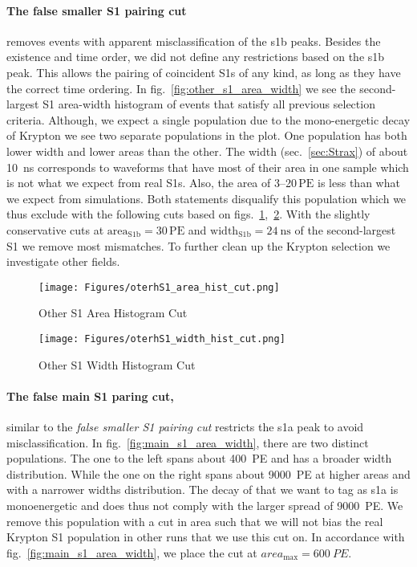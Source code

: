 \paragraph{The false smaller S1 pairing cut} removes events with apparent misclassification of the \gls{s1b} peaks.
Besides the existence and time order, we did not define any restrictions based on the \gls{s1b} peak.
This allows the pairing of coincident S1s of any kind, as long as they have the correct time ordering.
In fig.~\ref{fig:other_s1_area_width} we see the second-largest S1 area-width histogram of events that satisfy all previous selection criteria.
Although, we expect a single population due to the mono-energetic decay of Krypton we see two separate populations in the plot.
One population has both lower width and lower areas than the other.
The width (sec.~\ref{sec:Strax}) of about \SI{10}{\nano\s} corresponds to waveforms that have most of their area in one sample which is not what we expect from real S1s.
Also, the area of \numrange{3}{20}$\,\mathrm{PE}$ is less than what we expect from simulations.
Both statements disqualify this population which we thus exclude with the following cuts based on figs.~\ref{fig:other_s1_area_cut},~\ref{fig:other_s1_width_cut}.
With the slightly conservative cuts at $ \mathrm{area}_\mathrm{S1b} = 30\,\mathrm{PE}$ and $ \mathrm{width}_\mathrm{S1b} = \SI{24}{\nano\s} $ of the second-largest S1 we remove most mismatches.
To further clean up the Krypton selection we investigate other fields.


\begin{figure}[h]
\centering
\texttt{[image: Figures/oterhS1\_area\_hist\_cut.png]}  %
\caption[Other S1 Area Histogram Cut]{
        Other S1 Area Histogram Cut
    }
\label{fig:other_s1_area_cut}
\end{figure}


\begin{figure}
\centering
\texttt{[image: Figures/oterhS1\_width\_hist\_cut.png]}  %
\caption[Other S1 Width Histogram Cut]{
        Other S1 Width Histogram Cut
    }
\label{fig:other_s1_width_cut}
\end{figure}


\paragraph{The false main S1 paring cut,} similar to the \emph{false smaller S1 pairing cut} restricts the \gls{s1a} peak to avoid misclassification.
In fig.~\ref{fig:main_s1_area_width}, there are two distinct populations.
The one to the left spans about \SI{400}{PE} and has a broader width distribution.
While the one on the right spans about \SI{9000}{PE} at higher areas and with a narrower widths distribution.
The decay of  that we want to tag as \gls{s1a} is monoenergetic and does thus not comply with the larger spread of \SI{9000}{PE}.
We remove this population with a cut in area such that we will not bias the real Krypton S1 population in other runs that we use this cut on.
In accordance with fig.~\ref{fig:main_s1_area_width}, we place the cut at $ area_\mathrm{max} = \SI{600}{PE}$.

